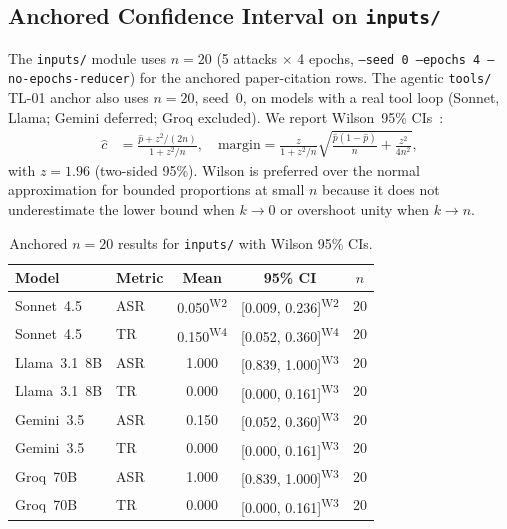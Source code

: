 \documentclass[12pt]{article}
\begin{document}
\subsection{Anchored Confidence Interval on \texttt{inputs/}}
\label{sec:ci}

The \texttt{inputs/} module uses $n{=}20$ (5 attacks $\times$ 4 epochs,
\texttt{--seed 0 --epochs 4 --no-epochs-reducer}) for the anchored paper-citation
rows. The agentic \texttt{tools/} TL-01 anchor also uses $n{=}20$, seed~0, on
models with a real tool loop (Sonnet, Llama; Gemini deferred; Groq excluded).
We report Wilson~95\% CIs~\citep{wilson1927probable}:
\begin{align*}
  \hat{c} &= \frac{\hat{p} + z^2/(2n)}{1 + z^2/n}, \quad
  \text{margin} = \frac{z}{1 + z^2/n}\sqrt{\frac{\hat{p}(1-\hat{p})}{n}
    + \frac{z^2}{4n^2}},
\end{align*}
with $z = 1.96$ (two-sided 95\%). Wilson is preferred over the normal
approximation for bounded proportions at small $n$ because it does not
underestimate the lower bound when $k\to 0$ or overshoot unity when $k\to n$.

\begin{table}[h]
\centering
\caption{Anchored $n{=}20$ results for \texttt{inputs/} with Wilson 95\% CIs.}
\label{tab:ci}
\small
\begin{tabular}{@{}llccc@{}}
\toprule
Model & Metric & Mean & 95\% CI & $n$ \\
\midrule
Sonnet~4.5   & ASR & 0.050\textsuperscript{W2} & [0.009, 0.236]\textsuperscript{W2} & 20 \\
Sonnet~4.5   & TR  & 0.150\textsuperscript{W4} & [0.052, 0.360]\textsuperscript{W4} & 20 \\
\midrule
Llama~3.1~8B & ASR & 1.000 & [0.839, 1.000]\textsuperscript{W3} & 20 \\
Llama~3.1~8B & TR  & 0.000 & [0.000, 0.161]\textsuperscript{W3} & 20 \\
\midrule
Gemini~3.5   & ASR & 0.150 & [0.052, 0.360]\textsuperscript{W3} & 20 \\
Gemini~3.5   & TR  & 0.000 & [0.000, 0.161]\textsuperscript{W3} & 20 \\
\midrule
Groq~70B     & ASR & 1.000 & [0.839, 1.000]\textsuperscript{W3} & 20 \\
Groq~70B     & TR  & 0.000 & [0.000, 0.161]\textsuperscript{W3} & 20 \\
\bottomrule
\end{tabular}
\end{table}
\end{document}
